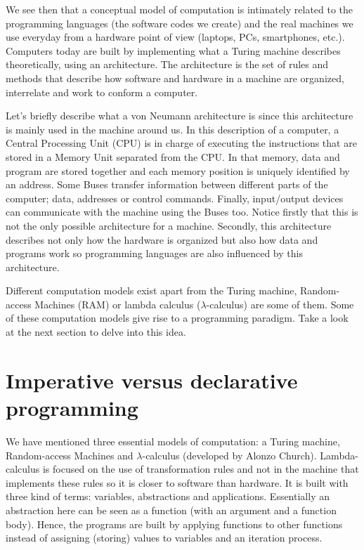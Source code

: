 We see then that a conceptual model of computation is intimately related to the programming languages (the software codes we create) and the 
real machines we use everyday from a hardware point of view (laptops, PCs, smartphones, etc.). Computers today are built by implementing what 
a Turing machine describes theoretically, using an architecture. The architecture is the set of rules and methods that describe how software 
and hardware in a machine are organized, interrelate and work to conform a computer.

Let's briefly describe what a von Neumann architecture is since this architecture is mainly used in the machine around us. 
In this description of a computer, a Central Processing Unit (CPU) is in charge of executing the instructions that are stored in a Memory Unit separated from the CPU. 
In that memory, data and program are stored together and each memory position is uniquely identified by an address. 
Some Buses transfer information between different parts of the computer; data, addresses or control commands. 
Finally, input/output devices can communicate with the machine using the Buses too. 
Notice firstly that this is not the only possible architecture for a machine. 
Secondly, this architecture describes not only how the hardware is organized but also how data and programs work so programming languages are also influenced by this architecture. 


Different computation models exist apart from the Turing machine, Random-access Machines (RAM) or lambda calculus ($\lambda$-calculus) are some of them. 
Some of these computation models give rise to a programming paradigm. Take a look at the next section to delve into this idea.  


 
 
    \section{Imperative versus declarative programming} 

We have mentioned three essential models of computation: a Turing machine, Random-access Machines and $\lambda$-calculus (developed by Alonzo Church).
Lambda-calculus is focused on the use of transformation rules and not in the machine that implements these rules so it is closer to software than hardware.
It is built with three kind of terms: variables, abstractions and applications. 
Essentially an abstraction here can be seen as a function (with an argument and a function body). 
Hence, the programs are built by applying functions to other functions instead of assigning (storing) values to variables and an iteration process. 

